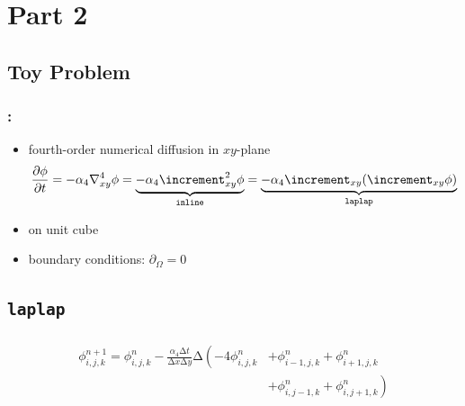 \documentclass[aspectratio=43, t]{beamer}
\renewcommand{\laplacian}{\increment}
\begin{document}
\section*{Part 2}
\subsection*{Toy Problem}
\begin{frame}
	\frametitle{\secname: \subsecname}
	\begin{itemize}
		\item fourth-order numerical diffusion in $xy$-plane
			\[ \pdv{\phi}{t} = -\alpha_{4} \nabla^{4}_{xy} \phi = \underbrace{-\alpha_{4} \laplacian^{2}_{xy} \phi}_{\texttt{inline}} = \underbrace{-\alpha_{4} \laplacian_{xy} (\laplacian_{xy} \phi)}_{\texttt{laplap}} \]
		\item on unit cube
		\item boundary conditions: \( \partial_{\Omega} = 0 \)
	\end{itemize}
\end{frame}

\subsection*{\texorpdfstring{\texttt{laplap}}{laplap}}
\begin{frame}
	\frametitle{\subsubsecname}
	\begin{align*}
		\phi_{i, j, k}^{n + 1} =
			\phi_{i, j, k}^{n} - \frac{\alpha_{4} \increment t}{\increment x \increment y} \laplacian \left(
				  -4 \phi_{i,     j,     k}^{n} \right.
				& +  \phi_{i - 1, j,     k}^{n}
				  +  \phi_{i + 1, j,     k}^{n} \\
				& \left.
				  +  \phi_{i,     j - 1, k}^{n}
				  +  \phi_{i,     j + 1, k}^{n}
			\right)
	\end{align*}
\end{frame}
\end{document}
